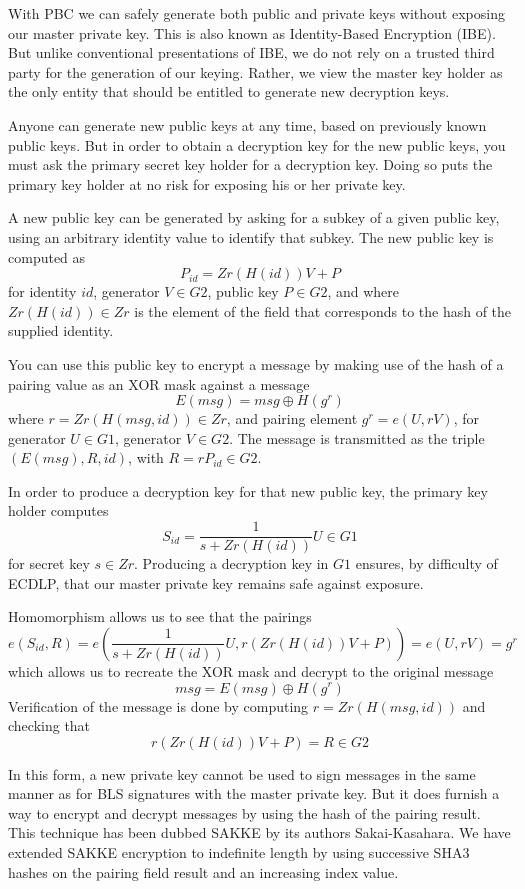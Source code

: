 \documentclass[article,oneside]{memoir}
\begin{document}
With PBC we can safely generate both public and private keys without exposing our master private key. This is also known as Identity-Based Encryption (IBE). But unlike conventional presentations of IBE, we do not rely on a trusted third party for the generation of our keying. Rather, we view the master key holder as the only entity that should be entitled to generate new decryption keys. 

Anyone can generate new public keys at any time, based on previously known public keys.
But in order to obtain a decryption key for the new public keys, you must ask the primary secret key holder for a decryption key. Doing so puts the primary key holder at no risk for exposing his or her private key.

A new public key can be generated by asking for a subkey of a given public key, using an arbitrary identity value to identify that subkey. The new public key is computed as $$ P_{id} = Zr(H(id)) V + P$$ for identity $id$, generator $V \in G2$, public key $P \in G2$, and where $Zr(H(id)) \in Zr$ is the element of the field that corresponds to the hash of the supplied identity. 

You can use this public key to encrypt a message by making use of the hash of a pairing value as an XOR mask against a message $$E(msg) = msg \oplus H(g^r)$$ where $r = Zr(H(msg, id)) \in Zr$, and pairing element $g^r = e(U, r V)$, for generator $U \in G1$, generator $V \in G2$. The message is transmitted as the triple $(E(msg), R, id)$, with $R = r P_{id} \in G2$.

In order to produce a decryption key for that new public key, the primary key holder computes $$S_{id} = \frac{1}{s + Zr(H(id))} U \in G1$$ for secret key $s \in Zr$. Producing a decryption key in $G1$ ensures, by difficulty of ECDLP, that our master private key remains safe against exposure.

Homomorphism allows us to see that the pairings 
$$e(S_{id}, R) = e(\frac{1}{s + Zr(H(id))} U, r(Zr(H(id)) V + P)) = e(U, r V) = g^r$$ which allows us to recreate the XOR mask and decrypt to the original message $$msg = E(msg) \oplus H(g^r)$$ Verification of the message is done by computing $r = Zr(H(msg, id))$ and checking that $$r (Zr(H(id)) V + P) = R \in G2$$

In this form, a new private key cannot be used to sign messages in the same manner as for BLS signatures with the master private key. But it does furnish a way to encrypt and decrypt messages by using the hash of the pairing result. This technique has been dubbed SAKKE by its authors Sakai-Kasahara\cite{sakke}. We have extended SAKKE encryption to indefinite length by using successive SHA3 hashes on the pairing field result and an increasing index value.
\end{document}
